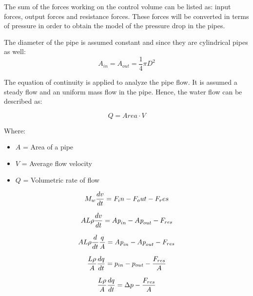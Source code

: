 The sum of the forces working on the control volume can be listed as: input forces, output forces and resistance forces.  
These forces will be converted in terms of pressure in order to obtain the model of the pressure drop in the pipes. 

The diameter of the pipe is assumed constant and since they are cylindrical pipes as well:
\begin{equation}
  A_{in} = A_{out} = \frac{1}{4}\pi D^{2}
\end{equation}

The equation of continuity is applied to analyze the pipe flow. It is assumed a steady flow and an uniform 
mass flow in the pipe. Hence, the water flow can be described as: 

\begin{equation}
  Q=Area \cdot V
	\label{EquationOfContinuity}
\end{equation}

Where: 

\begin{itemize}
  \item  $A$ = Area of a pipe
  \item $V$ = Average flow velocity
  \item $Q$ = Volumetric rate of flow
\end{itemize}

\begin{equation}
  M_w \frac{dv}{dt} = F_in - F_out - F_res \\
\end{equation}

\begin{equation}
    A L \rho \frac{dv}{dt} = A \textit{p}_{in} - A \textit{p}_{out} - F_{res} \\
\end{equation}

\begin{equation}
    A L \rho \frac{d}{dt} \frac{q}{A} = A \textit{p}_{in} - A \textit{p}_{out} - F_{res} \\
\end{equation}

\begin{equation}
    \frac{L \rho}{A} \frac{dq}{dt} =p_{in} - p_{out} - \frac{ F_{res}}{A} \\
\end{equation}

\begin{equation}
    \frac{L \rho}{A} \frac{dq}{dt} =\Delta p - \frac{ F_{res}}{A} \\
\end{equation}


